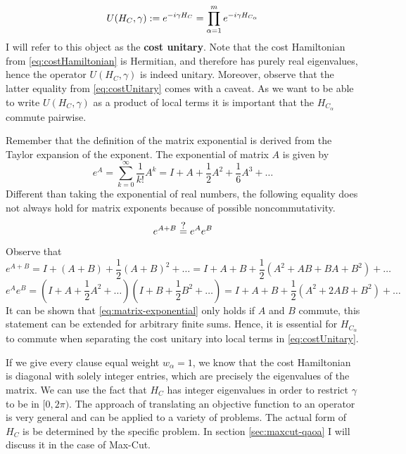 \begin{equation}
	U(H_C,\gamma) := e^{-i\gamma H_C } = \prod_{\alpha = 1}^m e^{-i\gamma H_{C_\alpha}}
	\label{eq:costUnitary}
\end{equation}
I will refer to this object as the \textbf{cost unitary}. Note that the cost Hamiltonian from \eqref{eq:costHamiltonian} is Hermitian, and therefore has purely real eigenvalues, hence the operator $U(H_C,\gamma)$ is indeed unitary. Moreover, observe that the latter equality from \eqref{eq:costUnitary} comes with a caveat. As we want to be able to write $U(H_C, \gamma)$ as a product of local terms it is important that the $H_{C_\alpha}$ commute pairwise. 

\begin{remark}
Remember that the definition of the matrix exponential is derived from the Taylor expansion of the exponent. The exponential of matrix $A$ is given by
\begin{equation}
e^A = \sum_{k=0}^{\infty} \frac{1}{k!}A^k = I + A + \frac{1}{2}A^2 + \frac{1}{6}A^3 + \dots
\end{equation}
Different than taking the exponential of real numbers, the following equality does not always hold for matrix exponents because of possible noncommutativity.
\begin{equation}
e^{A+B} \myeq{?} e^A e^B
\label{eq:matrix-exponential}
\end{equation}
Observe that
\begin{equation}
	e^{A+B} = I + (A+B) + \frac{1}{2}(A+B)^2 + \dots = I + A+B + \frac{1}{2}(A^2 + AB + BA + B^2) + \dots
\end{equation}
\begin{equation}
	e^{A}e^{B} = (I + A + \frac{1}{2}A^2 + \dots)(I + B + \frac{1}{2}B^2 + \dots) = I + A + B + \frac{1}{2}(A^2+2AB+B^2) + \dots
\end{equation}
It can be shown that \eqref{eq:matrix-exponential} only holds if $A$ and $B$ commute, this statement can be extended for arbitrary finite sums. Hence, it is essential for $H_{C_\alpha}$ to commute when separating the cost unitary into local terms in \eqref{eq:costUnitary}.
\end{remark}
If we give every clause equal weight $w_\alpha = 1$, we know that the cost Hamiltonian is diagonal with solely integer entries, which are precisely the eigenvalues of the matrix. We can use the fact that $H_C$ has integer eigenvalues in order to restrict $\gamma$ to be in $[0,2\pi)$. The approach of translating an objective function to an operator is very general and can be applied to a variety of problems. The actual form of $H_C$ is be determined by the specific problem. In section \ref{sec:maxcut-qaoa} I will discuss it in the case of Max-Cut.

